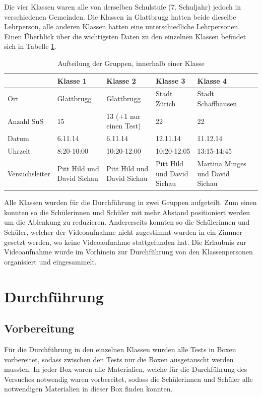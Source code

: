 Die vier Klassen waren alle von derselben Schulstufe (7. Schuljahr) jedoch in verschiedenen Gemeinden. Die Klassen in Glattbrugg hatten beide dieselbe Lehrperson, alle anderen Klassen hatten eine unterschiedliche Lehrpersonen. Einen Überblick über die wichtigsten Daten zu den einzelnen Klassen befindet sich in Tabelle \ref{tab:Klassen}. 


\begin{table}[htbp]
  \centering
  \begin{tabular}{@{}lp{2.3cm}p{3cm}p{3cm}p{3cm}p{3cm}@{}}
  \toprule
   & Klasse 1 & Klasse 2 & Klasse 3 & Klasse 4 \\ 
  \midrule
   Ort & Glattbrugg & Glattbrugg & Stadt Zürich & Stadt Schaffhausen \\ [0.2cm]
   Anzahl SuS & 15 & 13 (+1 nur einen Test) & 22 & 22 \\ [0.2cm]
   Datum  & 6.11.14 & 6.11.14 & 12.11.14 & 11.12.14\\ [0.3cm]
   Uhrzeit & 8:20-10:00 & 10:20-12:00& 10:20-12:05 & 13:15-14:45 \\ [0.3cm]
   Versuchsleiter & Pitt Hild und David Sichau   & Pitt Hild und David Sichau  & Pitt Hild und David Sichau  & Martina Minges und David Sichau \\
  \bottomrule
  \end{tabular} 
  \caption{Aufteilung der Gruppen, innerhalb einer Klasse}
  \label{tab:Klassen}
\end{table}

Alle Klassen wurden für die Durchführung in zwei Gruppen aufgeteilt. Zum einen konnten so die Schülerinnen und Schüler mit mehr Abstand positioniert werden um die Ablenkung zu reduzieren. Andererseits konnten so die Schülerinnen und Schüler, welcher der Videoaufnahme nicht zugestimmt wurden in ein Zimmer gesetzt werden, wo keine Videoaufnahme stattgefunden hat. Die Erlaubnis zur Videoaufnahme wurde im Vorhinein zur Durchführung von den Klassenpersonen organisiert und eingesammelt.



\section{Durchführung}

\subsection{Vorbereitung}
Für die Durchführung in den einzelnen Klassen wurden alle Tests in Boxen vorbereitet, sodass zwischen den Tests nur die Boxen ausgetauscht werden mussten. In jeder Box waren alle Materialien, welche für die Durchführung des Versuches notwendig waren vorbereitet, sodass die Schülerinnen und Schüler alle notwendigen Materialien in dieser Box finden konnten.  

